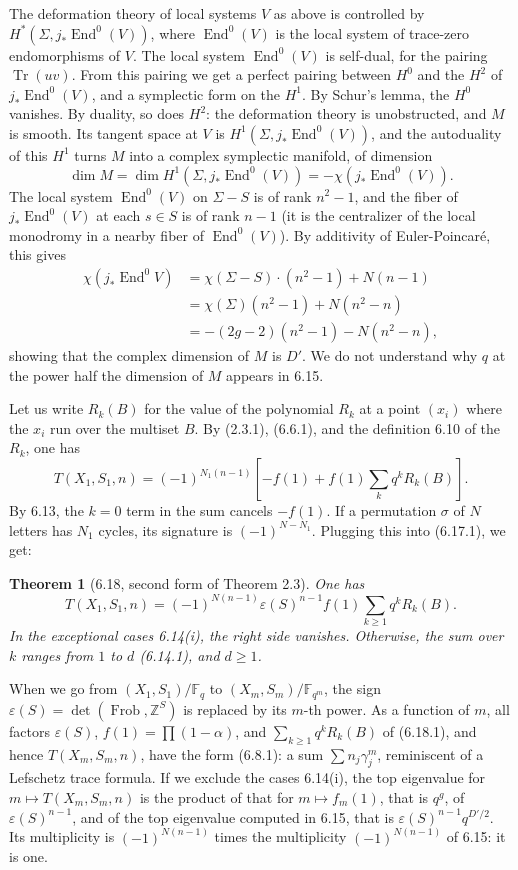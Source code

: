 \documentclass[10pt]{article}
\newcommand{\Fq}{\mathbb F_q}
\newcommand{\Fb}{\mathbb F}
\newcommand{\Z}{\mathbb Z}
\newcommand{\End}{\operatorname{End}}
\newcommand{\Frob}{\operatorname{Frob}}
\newcommand{\Tr}{\operatorname{Tr}}
\theoremstyle{deligne}
\newtheorem*{theorem*}{Theorem}
\newcommand{\heading}[1]{\vspace{0.7em}\noindent{\bfseries #1}\quad}
\begin{document}
The deformation theory of local systems $V$ as above is controlled by $H^*(\Sigma,j_*\End^0(V))$, where $\End^0(V)$ is the local system of trace-zero endomorphisms of $V$. The local system $\End^0(V)$ is self-dual, for the pairing $\Tr(uv)$. From this pairing we get a perfect pairing between $H^0$ and the $H^2$ of $j_*\End^0(V)$, and a symplectic form on the $H^1$. By Schur's lemma, the $H^0$ vanishes. By duality, so does $H^2$: the deformation theory is unobstructed, and $M$ is smooth. Its tangent space at $V$ is $H^1(\Sigma,j_*\End^0(V))$, and the autoduality of this $H^1$ turns $M$ into a complex symplectic manifold, of dimension
\[
\dim M=\dim H^1(\Sigma,j_*\End^0(V))=-\chi(j_*\End^0(V)).
\]
The local system $\End^0(V)$ on $\Sigma-S$ is of rank $n^2-1$, and the fiber of $j_*\End^0(V)$ at each $s\in S$ is of rank $n-1$ (it is the centralizer of the local monodromy in a nearby fiber of $\End^0(V)$). By additivity of Euler-Poincaré, this gives
\begin{align*}
\chi(j_*\End^0 V)&=\chi(\Sigma-S)\cdot(n^2-1)+N(n-1)\\
&=\chi(\Sigma)(n^2-1)+N(n^2-n)\\
&=-(2g-2)(n^2-1)-N(n^2-n),
\end{align*}
showing that the complex dimension of $M$ is $D'$. We do not understand why $q$ at the power half the dimension of $M$ appears in 6.15.

\heading{6.17.} Let us write $R_k(B)$ for the value of the polynomial $R_k$ at a point $(x_i)$ where the $x_i$ run over the multiset $B$. By (2.3.1), (6.6.1), and the definition 6.10 of the $R_k$, one has
\begin{equation}\tag{6.17.1}
T(X_1,S_1,n)=(-1)^{N_1(n-1)}\left[-f(1)+f(1)\sum_k q^kR_k(B)\right].
\end{equation}
By 6.13, the $k=0$ term in the sum cancels $-f(1)$. If a permutation $\sigma$ of $N$ letters has $N_1$ cycles, its signature is $(-1)^{N-N_1}$. Plugging this into (6.17.1), we get:

\begin{theorem*}[6.18, second form of Theorem 2.3]
One has
\begin{equation}\tag{6.18.1}
T(X_1,S_1,n)=(-1)^{N(n-1)}\varepsilon(S)^{n-1}f(1)\sum_{k\ge1}q^kR_k(B).
\end{equation}
In the exceptional cases 6.14(i), the right side vanishes. Otherwise, the sum over $k$ ranges from $1$ to $d$ (6.14.1), and $d\ge1$.
\end{theorem*}

When we go from $(X_1,S_1)/\Fq$ to $(X_m,S_m)/\Fb_{q^m}$, the sign $\varepsilon(S)=\det(\Frob,\Z^S)$ is replaced by its $m$-th power. As a function of $m$, all factors $\varepsilon(S)$, $f(1)=\prod(1-\alpha)$, and $\sum_{k\ge1}q^kR_k(B)$ of (6.18.1), and hence $T(X_m,S_m,n)$, have the form (6.8.1): a sum $\sum n_j\gamma_j^m$, reminiscent of a Lefschetz trace formula. If we exclude the cases 6.14(i), the top eigenvalue for $m\mapsto T(X_m,S_m,n)$ is the product of that for $m\mapsto f_m(1)$, that is $q^g$, of $\varepsilon(S)^{n-1}$, and of the top eigenvalue computed in 6.15, that is $\varepsilon(S)^{n-1}q^{D'/2}$. Its multiplicity is $(-1)^{N(n-1)}$ times the multiplicity $(-1)^{N(n-1)}$ of 6.15: it is one.
\end{document}

